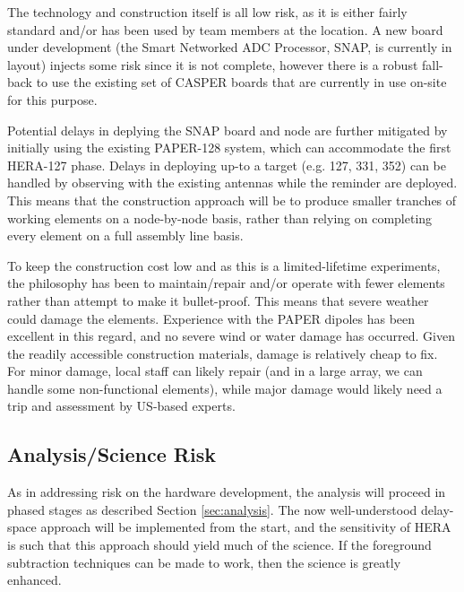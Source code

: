 \documentclass[preprint]{aastex}
\begin{document}
The technology and construction itself is all low risk, as it is either fairly standard and/or
has been used by team members at the location.  A new board under development (the Smart Networked
ADC Processor, SNAP, is currently in layout) injects some risk since it is not complete, however there
is a robust fall-back to use the existing set of CASPER boards that are currently in use on-site for this
purpose. 

Potential delays in deplying the SNAP board and node are further 
mitigated by initially using the existing PAPER-128 system, which can accommodate the first 
HERA-127 phase.  Delays in deploying up-to a target (e.g. 127, 331, 352) can be handled by
observing with the existing antennas while the reminder are deployed.  This means that the
construction approach will be to produce smaller tranches of working elements on a node-by-node
basis, rather than relying on completing every element on a full assembly line basis.

To keep the construction cost low and as this is a limited-lifetime experiments, 
the philosophy has been to maintain/repair and/or operate with fewer elements rather
than attempt to make it bullet-proof. This means that severe weather could damage the
elements. Experience with the PAPER dipoles has been excellent in this regard, and no
severe wind or water damage has occurred. Given the readily accessible
construction materials, damage is relatively cheap to fix. For minor damage, local
staff can likely repair (and in a large array, we can handle some non-functional
elements), while major damage would likely need a trip and assessment by US-based
experts.

\subsection{Analysis/Science Risk}
As in addressing risk on the hardware development, the analysis will proceed in
phased stages as described Section \ref{sec:analysis}. The now well-understood
delay-space approach will be implemented from the start, and the sensitivity of HERA
is such that this approach should yield much of the science. If the foreground
subtraction techniques can be made to work, then the science is greatly enhanced.
\end{document}
